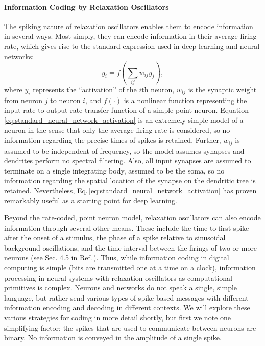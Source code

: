 \paragraph{Information Coding by Relaxation Oscillators}
The spiking nature of relaxation oscillators enables them to encode information in several ways. Most simply, they can encode information in their average firing rate, which gives rise to the standard expression used in deep learning and neural networks:
\begin{equation}
\label{eq:standard_neural_network_activation} 
y_i = f(\sum_{ij}w_{ij}y_j),
\end{equation}
where $y_i$ represents the ``activation'' of the $i$th neuron, $w_{ij}$ is the synaptic weight from neuron $j$ to neuron $i$, and $f(\cdot)$ is a nonlinear function representing the input-rate-to-output-rate transfer function of a simple point neuron. Equation \ref{eq:standard_neural_network_activation} is an extremely simple model of a neuron in the sense that only the average firing rate is considered, so no information regarding the precise times of spikes is retained. Further, $w_{ij}$ is assumed to be independent of frequency, so the model assumes synapses and dendrites perform no spectral filtering. Also, all input synapses are assumed to terminate on a single integrating body, assumed to be the soma, so no information regarding the spatial location of the synapse on the dendritic tree is retained. Nevertheless, Eq.\,\ref{eq:standard_neural_network_activation} has proven remarkably useful as a starting point for deep learning. 

Beyond the rate-coded, point neuron model, relaxation oscillators can also encode information through several other means. These include the time-to-first-spike after the onset of a stimulus, the phase of a spike relative to sinusoidal background oscillations, and the time interval between the firings of two or more neurons (see Sec. 4.5 in Ref.\,\cite{geki2002}). Thus, while information coding in digital computing is simple (bits are transmitted one at a time on a clock), information processing in neural systems with relaxation oscillators as computational primitives is complex. Neurons and networks do not speak a single, simple language, but rather send various types of spike-based messages with different information encoding and decoding in different contexts. We will explore these various strategies for coding in more detail shortly, but first we note one simplifying factor: the spikes that are used to communicate between neurons are binary. No information is conveyed in the amplitude of a single spike.

